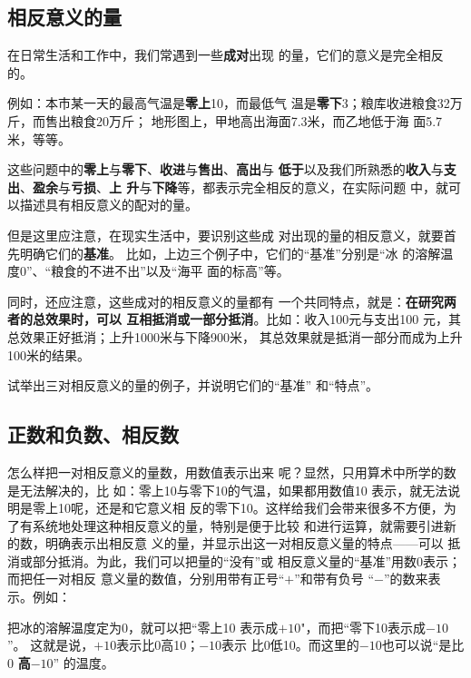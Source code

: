 \subsection{相反意义的量}

在日常生活和工作中，我们常遇到一些\textbf{成对}出现
的量，它们的意义是完全相反的。

例如：本市某一天的最高气温是\textbf{零上}10\oc，而最低气
温是\textbf{零下}3\oc；粮库收进粮食32万斤，而售出粮食20万斤；
地形图上，甲地高出海面7.3米，而乙地低于海
面5.7米，等等。

这些问题中的\textbf{零上}与\textbf{零下}、\textbf{收进}与\textbf{售出}、\textbf{高出}与
\textbf{低于}以及我们所熟悉的\textbf{收入}与\textbf{支出}、\textbf{盈余}与\textbf{亏损}、\textbf{上
	升}与\textbf{下降}等，都表示完全相反的意义，在实际问题
中，就可以描述具有相反意义的配对的量。

但是这里应注意，在现实生活中，要识别这些成
对出现的量的相反意义，就要首先明确它们的\textbf{基准}。
比如，上边三个例子中，它们的“基准”分别是“冰
的溶解温度0\oc”、“粮食的不进不出”以及“海平
面的标高”等。

同时，还应注意，这些成对的相反意义的量都有
一个共同特点，就是：\textbf{在研究两者的总效果时，可以
	互相抵消或一部分抵消}。比如：收入100元与支出100
元，其总效果正好抵消；上升1000米与下降900米，
其总效果就是抵消一部分而成为上升100米的结果。

\begin{ex}
	试举出三对相反意义的量的例子，并说明它们的“基准”
	和“特点”。
\end{ex}

\subsection{正数和负数、相反数}
怎么样把一对相反意义的量数，用数值表示出来
呢？显然，只用算术中所学的数是无法解决的，比
如：零上10\oc 与零下10\oc 的气温，如果都用数值10
表示，就无法说明是零上10\oc 呢，还是和它意义相
反的零下10\oc。这样给我们会带来很多不方便，为
了有系统地处理这种相反意义的量，特别是便于比较
和进行运算，就需要引进新的数，明确表示出相反意
义的量，并显示出这一对相反意义量的特点——可以
抵消或部分抵消。为此，我们可以把量的“没有”或
相反意义量的“基准”用数0表示；而把任一对相反
意义量的数值，分别用带有正号“$+$”和带有负号
“$-$”的数来表示。例如：

把冰的溶解温度定为0\oc，就可以把“零上10\oc
表示成$+10$\oc"，而把“零下10\oc 表示成$-10$\oc”。
这就是说，$+ 10$\oc 表示比0\oc 高10\oc；$-10$\oc 表示
比0\oc 低10\oc 。而这里的$-10$\oc 也可以说“是比0\oc
\textbf{高}$-10$\oc” 的温度。

